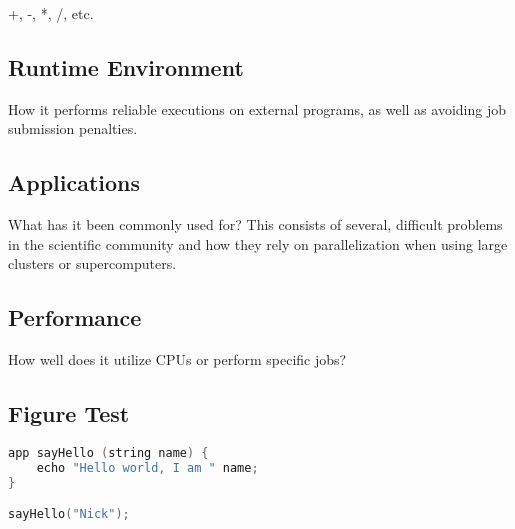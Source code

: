     +, -, *, /, etc.

\subsection{Runtime Environment}

How it performs reliable executions on external programs, as well as avoiding job submission penalties. \cite{wilde2011swift}

\subsection{Applications}

What has it been commonly used for? This consists of several, difficult problems in the scientific community and how they rely on parallelization when using large clusters or supercomputers. \cite{wilde2009parallel} \cite{hategan2011coasters}

\subsection{Performance}

How well does it utilize CPUs or perform specific jobs? \cite{wilde2011swift}

\subsection{Figure Test}

    \begin{lstlisting}[language=swift]
app sayHello (string name) {
    echo "Hello world, I am " name;
}

sayHello("Nick");
    \end{lstlisting}
